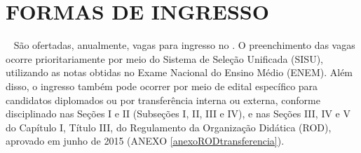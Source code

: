 \section{FORMAS DE INGRESSO}
~
São ofertadas, anualmente, \NUMVAGAS{} vagas para ingresso no \NOMECURSO. O preenchimento das vagas ocorre prioritariamente por meio do Sistema de Seleção Unificada (SISU), utilizando as notas obtidas no Exame Nacional do Ensino Médio (ENEM). Além disso, o ingresso também pode ocorrer por meio de edital específico para candidatos diplomados ou por transferência interna ou externa, conforme disciplinado nas Seções I e II (Subseções I, II, III e IV), e nas Seções III, IV e V do Capítulo I, Título III, do Regulamento da Organização Didática (ROD), aprovado em junho de 2015 (ANEXO \ref{anexoRODtransferencia}).

